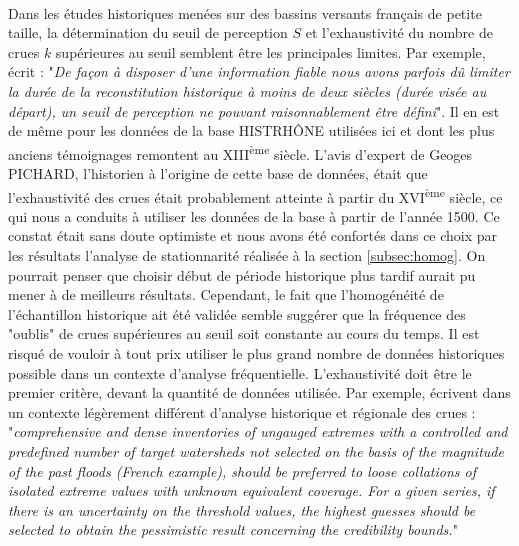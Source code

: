 \documentclass[11pt]{article}
\begin{document}
	\paragraph{} Dans les études historiques menées sur des bassins versants français de petite taille, la détermination du seuil de perception $S$ et l'exhaustivité du nombre de crues $k$ supérieures au seuil semblent être les principales limites. Par exemple, \citet{payrastre_possibility_2005} écrit : "\textit{De façon à disposer d'une information fiable nous avons parfois dû limiter la durée de la reconstitution historique à moins de deux siècles (durée visée au départ), un seuil de perception ne pouvant raisonnablement être défini}". Il en est de même pour les données de la base HISTRHÔNE utilisées ici et dont les plus anciens témoignages remontent au XIII\textsuperscript{ème} siècle. L'avis d'expert de Geoges PICHARD, l'historien à l'origine de cette base de données, était que l'exhaustivité des crues était probablement atteinte à partir du XVI\textsuperscript{ème} siècle, ce qui nous a conduits à utiliser les données de la base à partir de l'année 1500. Ce constat était sans doute optimiste et nous avons été confortés dans ce choix par les résultats l'analyse de stationnarité réalisée à la section \ref{subsec:homog}. On pourrait penser que choisir début de période historique plus tardif aurait pu mener à de meilleurs résultats. Cependant, le fait que l'homogénéité de l'échantillon historique ait été validée semble suggérer que la fréquence des "oublis" de crues supérieures au seuil soit constante au cours du temps. Il est risqué de vouloir à tout prix utiliser le plus grand nombre de données historiques possible dans un contexte d'analyse fréquentielle. L'exhaustivité doit être le premier critère, devant la quantité de données utilisée. Par exemple, \citet{gaume_bayesian_2010} écrivent dans un contexte légèrement différent d'analyse historique et régionale des crues : "\textit{comprehensive and dense inventories of ungauged extremes with a controlled and predefined number of target watersheds not selected on the basis of the magnitude of the past floods (French example), should be preferred to loose collations of isolated extreme values with unknown equivalent coverage. For a given series, if there is an uncertainty on the threshold values, the highest guesses should be selected to obtain the pessimistic result concerning the credibility bounds.}"
	
\end{document}

